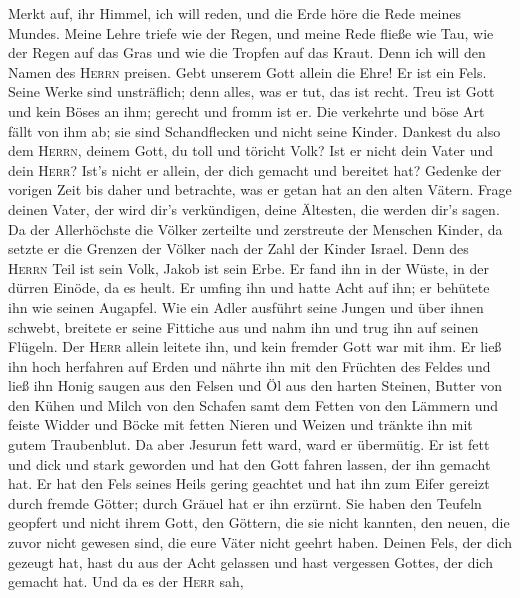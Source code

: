  Merkt auf, ihr Himmel, ich will reden, und die Erde höre
die Rede meines Mundes.  Meine Lehre triefe wie der Regen,
und meine Rede fließe wie Tau, wie der Regen auf das Gras und wie die
Tropfen auf das Kraut.  Denn ich will den Namen des
\textsc{Herrn} preisen. Gebt unserem Gott allein die Ehre!
 Er ist ein Fels. Seine Werke sind unsträflich; denn
alles, was er tut, das ist recht. Treu ist Gott und kein Böses an ihm;
gerecht und fromm ist er.  Die verkehrte und böse Art
fällt von ihm ab; sie sind Schandflecken und nicht seine Kinder.
 Dankest du also dem \textsc{Herrn}, deinem Gott, du toll
und töricht Volk? Ist er nicht dein Vater und dein \textsc{Herr}? Ist's
nicht er allein, der dich gemacht und bereitet hat? 
Gedenke der vorigen Zeit bis daher und betrachte, was er getan hat an
den alten Vätern. Frage deinen Vater, der wird dir's verkündigen, deine
Ältesten, die werden dir's sagen.  Da der Allerhöchste die
Völker zerteilte und zerstreute der Menschen Kinder, da setzte er die
Grenzen der Völker nach der Zahl der Kinder Israel.  Denn
des \textsc{Herrn} Teil ist sein Volk, Jakob ist sein Erbe.
 Er fand ihn in der Wüste, in der dürren Einöde, da es
heult. Er umfing ihn und hatte Acht auf ihn; er behütete ihn wie seinen
Augapfel.  Wie ein Adler ausführt seine Jungen und über
ihnen schwebt, breitete er seine Fittiche aus und nahm ihn und trug ihn
auf seinen Flügeln.  Der \textsc{Herr} allein leitete
ihn, und kein fremder Gott war mit ihm.  Er ließ ihn hoch
herfahren auf Erden und nährte ihn mit den Früchten des Feldes und ließ
ihn Honig saugen aus den Felsen und Öl aus den harten Steinen,
 Butter von den Kühen und Milch von den Schafen samt dem
Fetten von den Lämmern und feiste Widder und Böcke mit fetten Nieren und
Weizen und tränkte ihn mit gutem Traubenblut.  Da aber
Jesurun fett ward, ward er übermütig. Er ist fett und dick und stark
geworden und hat den Gott fahren lassen, der ihn gemacht hat. Er hat den
Fels seines Heils gering geachtet  und hat ihn zum Eifer
gereizt durch fremde Götter; durch Gräuel hat er ihn erzürnt.
 Sie haben den Teufeln geopfert und nicht ihrem Gott, den
Göttern, die sie nicht kannten, den neuen, die zuvor nicht gewesen sind,
die eure Väter nicht geehrt haben.  Deinen Fels, der dich
gezeugt hat, hast du aus der Acht gelassen und hast vergessen Gottes,
der dich gemacht hat.  Und da es der \textsc{Herr} sah,

